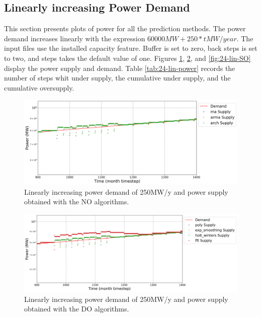 \documentclass[11pt]{article}
\begin{document}
\subsection{Linearly increasing Power Demand}

This section presents plots of power for all the prediction methods. The power demand increases linearly with the expression $60000 MW + 250*t MW/year$. The input files use the installed capacity feature. Buffer is set to zero, back steps is set to two, and steps takes the default value of one.
Figures \ref{fig:24-lin-NO}, \ref{fig:24-lin-DO}, and \ref{fig:24-lin-SO} display the power supply and demand.
Table \ref{tab:24-lin-power} records the number of steps whit under supply, the cumulative under supply, and the cumulative oversupply.

\begin{figure}[H]
	\centering
	\includegraphics[width=\textwidth]{24-figures/lin-24-power-buffer01.png} 
	\hfill
	\caption{Linearly increasing power demand of 250MW/y and power supply obtained with the NO algorithms.}
	\label{fig:24-lin-NO}
\end{figure}

\begin{figure}[H]
	\centering
	\includegraphics[width=\textwidth]{24-figures/lin-24-power-buffer02.png} 
	\hfill
	\caption{Linearly increasing power demand of 250MW/y and power supply obtained with the DO algorithms.}
	\label{fig:24-lin-DO}
\end{figure}
\end{document}

